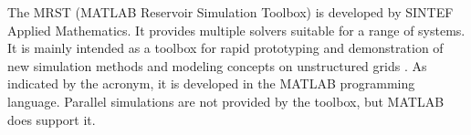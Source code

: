 The MRST (MATLAB Reservoir Simulation Toolbox) is developed by SINTEF Applied Mathematics. It provides multiple solvers suitable for a range of systems. It is mainly intended as a toolbox for rapid prototyping and demonstration of new simulation methods and modeling concepts on unstructured grids \cite{Sintef2014Mrst}. As indicated by the acronym, it is developed in the MATLAB programming language. Parallel simulations are not provided by the toolbox, but MATLAB does support it.


